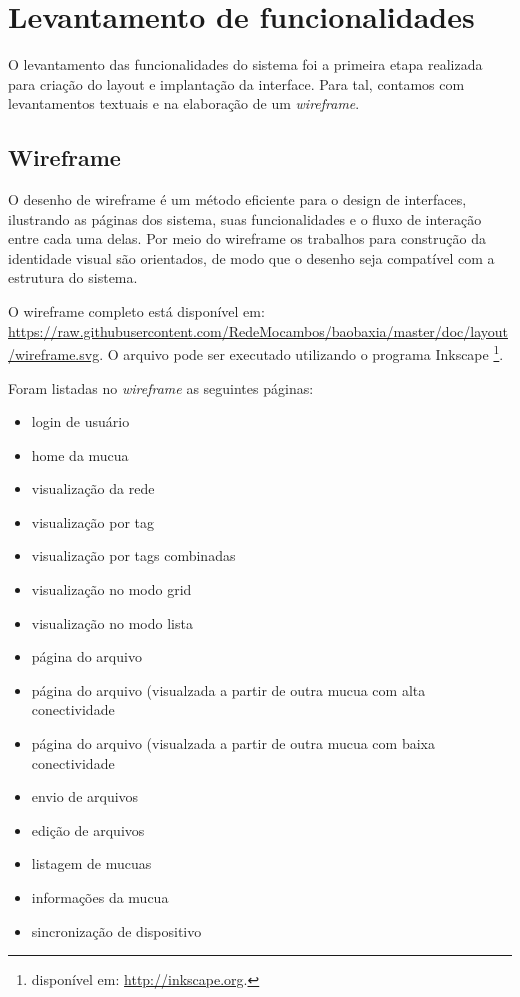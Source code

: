 \section{Levantamento de funcionalidades}
O levantamento das funcionalidades do sistema foi a primeira etapa
realizada para criação do layout e implantação da interface. Para
tal, contamos com levantamentos textuais e na elaboração de um
\emph{wireframe}.

\subsection{Wireframe}
O desenho de wireframe é um método eficiente para o design de
interfaces, ilustrando as páginas dos sistema, suas funcionalidades
e o fluxo de interação entre cada uma delas. Por meio do wireframe
os trabalhos para construção da identidade visual são orientados,
de modo que o desenho seja compatível com a estrutura do sistema.

O wireframe completo está disponível em: \url{https://raw.githubusercontent.com/RedeMocambos/baobaxia/master/doc/layout/wireframe.svg}.
O arquivo pode ser executado utilizando o programa Inkscape \footnote{disponível
  em: \url{http://inkscape.org}.}.

Foram listadas no \emph{wireframe} as seguintes páginas:
\begin{itemize}
  \item login de usuário
  \item home da mucua
  \item visualização da rede
  \item visualização por tag
  \item visualização por tags combinadas
  \item visualização no modo grid
  \item visualização no modo lista
  \item página do arquivo
  \item página do arquivo (visualzada a partir de outra mucua com alta
    conectividade
  \item página do arquivo (visualzada a partir de outra mucua com baixa
    conectividade
  \item envio de arquivos
  \item edição de arquivos
  \item listagem de mucuas
  \item informações da mucua
  \item sincronização de dispositivo
\end{itemize}

